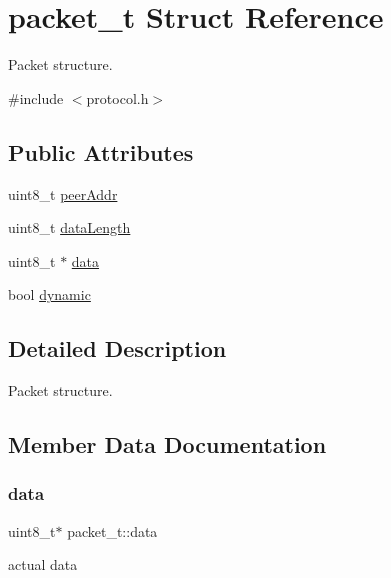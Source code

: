 \hypertarget{structpacket__t}{}\section{packet\+\_\+t Struct Reference}
\label{structpacket__t}


Packet structure.  




{\ttfamily \#include $<$protocol.\+h$>$}

\subsection*{Public Attributes}
\begin{DoxyCompactItemize}
\item 
uint8\+\_\+t \hyperlink{structpacket__t_aa448c0839206ebe76c552b9015eac856}{peer\+Addr}
\item 
uint8\+\_\+t \hyperlink{structpacket__t_aab546f51a39cf348d2a066dd71a76e93}{data\+Length}
\item 
uint8\+\_\+t $\ast$ \hyperlink{structpacket__t_a29363728ac16a6044f9bc20ea5daaa1f}{data}
\item 
bool \hyperlink{structpacket__t_a18a6d2e6ecda8601ae28ac4fd22450ac}{dynamic}
\end{DoxyCompactItemize}


\subsection{Detailed Description}
Packet structure. 

\subsection{Member Data Documentation}
\mbox{\label{structpacket__t_a29363728ac16a6044f9bc20ea5daaa1f}} 
\subsubsection{\texorpdfstring{data}{data}}
{\footnotesize\ttfamily uint8\+\_\+t$\ast$ packet\+\_\+t\+::data}

actual data \mbox{\label{structpacket__t_aab546f51a39cf348d2a066dd71a76e93}} 
